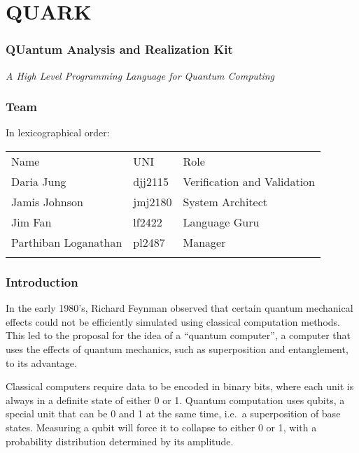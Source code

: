 \documentclass[]{article}
\date{}
\begin{document}
\section{QUARK}\label{quark}

\subsubsection{QUantum Analysis and Realization
Kit}\label{quantum-analysis-and-realization-kit}

\emph{A High Level Programming Language for Quantum Computing}

\subsubsection{Team}\label{team}

In lexicographical order:

\begin{longtable}[c]{@{}lll@{}}
\toprule\addlinespace
Name & UNI & Role
\\\addlinespace
\midrule\endhead
Daria Jung & djj2115 & Verification and Validation
\\\addlinespace
Jamis Johnson & jmj2180 & System Architect
\\\addlinespace
Jim Fan & lf2422 & Language Guru
\\\addlinespace
Parthiban Loganathan & pl2487 & Manager
\\\addlinespace
\bottomrule
\end{longtable}

\subsubsection{Introduction}\label{introduction}

In the early 1980's, Richard Feynman observed that certain quantum
mechanical effects could not be efficiently simulated using classical
computation methods. This led to the proposal for the idea of a
``quantum computer'', a computer that uses the effects of quantum
mechanics, such as superposition and entanglement, to its advantage.

Classical computers require data to be encoded in binary bits, where
each unit is always in a definite state of either 0 or 1. Quantum
computation uses qubits, a special unit that can be 0 and 1 at the same
time, i.e.~a superposition of base states. Measuring a qubit will force
it to collapse to either 0 or 1, with a probability distribution
determined by its amplitude.
\end{document}
